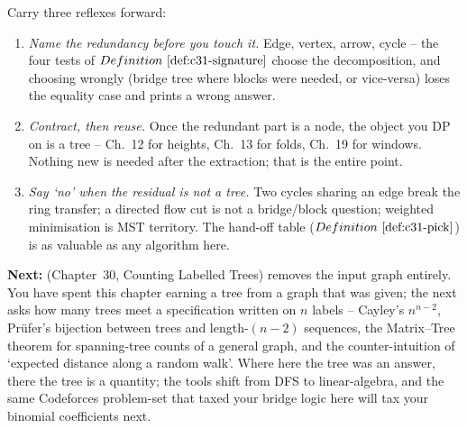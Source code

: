 \begin{lastword}
\medskip
Carry three reflexes forward:
\begin{enumerate}[nosep, leftmargin=1.6em]
  \item \emph{Name the redundancy before you touch it.}  Edge, vertex, arrow, cycle --
        the four tests of \(\defref{c31-signature}\) choose the decomposition, and
        choosing wrongly (bridge tree where blocks were needed, or vice-versa)
        loses the equality case and prints a wrong answer.
  \item \emph{Contract, then reuse.}  Once the redundant part is a node, the object
        you DP on is a tree -- Ch.~12 for heights, Ch.~13 for folds, Ch.~19 for windows.
        Nothing new is needed after the extraction; that is the entire point.
  \item \emph{Say `no' when the residual is not a tree.}  Two cycles sharing an edge
        break the ring transfer; a directed flow cut is not a bridge/block question;
        weighted minimisation is MST territory.  The hand-off table
        (\(\defref{c31-pick}\)) is as valuable as any algorithm here.
\end{enumerate}

\medskip
\textbf{Next:}  (Chapter~30, Counting Labelled Trees) removes the input
graph entirely.  You have spent this chapter earning a tree from a graph that was
given; the next asks how many trees meet a specification written on \(n\) labels --
Cayley's \(n^{n-2}\), Pr\"ufer's bijection between trees and length-\((n-2)\) sequences,
the Matrix--Tree theorem for spanning-tree counts of a general graph, and the
counter-intuition of `expected distance along a random walk'.  Where here the
tree was an answer, there the tree is a quantity; the tools shift from DFS to
linear-algebra, and the same Codeforces problem-set that taxed your bridge logic
here will tax your binomial coefficients next.
\end{lastword}
